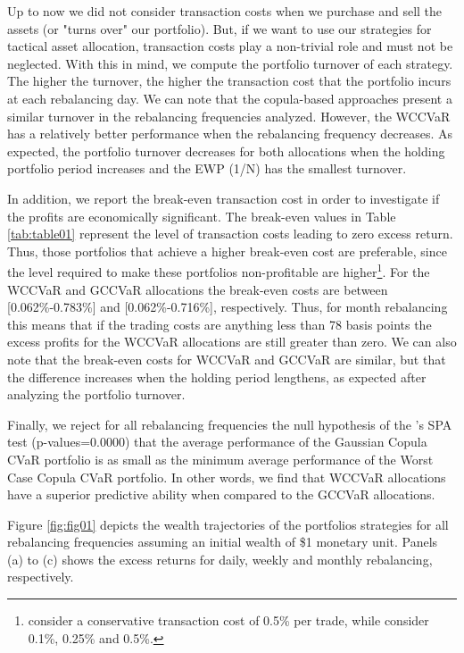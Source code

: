 \documentclass[a4paper,12pt]{report}
\begin{document}
Up to now we did not consider transaction costs when we purchase and sell
the assets (or "turns over" our portfolio). But, if we want to use our
strategies for tactical asset allocation, transaction costs play a
non-trivial role and must not be neglected. With this in mind, we compute
the portfolio turnover of each strategy. The higher the turnover, the higher
the transaction cost that the portfolio incurs at each rebalancing day. We can note that the copula-based approaches present a similar turnover in the rebalancing frequencies analyzed. However, the WCCVaR has a relatively better performance when the rebalancing frequency decreases. As expected, the portfolio turnover decreases for both allocations
when the holding portfolio period increases and the EWP (1/N) has the
smallest turnover.

In addition, we report the break-even transaction cost in order to investigate
if the profits are economically significant. The break-even values in Table
\ref{tab:table01} represent the level of transaction
costs leading to zero excess return. Thus, those portfolios that achieve a
higher break-even cost are preferable, since the level required to make
these portfolios non-profitable are higher\footnote{\citet*{jega1993} consider a conservative transaction cost of 0.5\% per
	trade, while \citet*{allen1999} consider 0.1\%, 0.25\% and 0.5\%.}. For the
WCCVaR and GCCVaR allocations the break-even costs are between [0.062\%-0.783\%]
and [0.062\%-0.716\%], respectively. Thus, for month rebalancing this means
that if the trading costs are anything less than 78 basis points the excess
profits for the WCCVaR allocations are still greater than zero. We can also note
that the break-even costs for WCCVaR and GCCVaR are similar, but that the
difference increases when the holding period lengthens, as expected after analyzing the portfolio turnover. 

Finally, we reject for all rebalancing frequencies the null hypothesis of the \citet*{hansen2005test}'s SPA test (p-values=0.0000) that the average performance of the Gaussian Copula CVaR 
portfolio is as small as the minimum average
performance of the Worst Case Copula CVaR portfolio. In other words, we find that WCCVaR allocations have a superior predictive ability when compared to the GCCVaR allocations.


Figure \ref{fig:fig01} depicts the wealth trajectories of the portfolios strategies for all rebalancing frequencies assuming an initial wealth of \$1 monetary unit. Panels (a) to (c) shows the excess returns for daily, weekly and monthly rebalancing, respectively.
\end{document}
